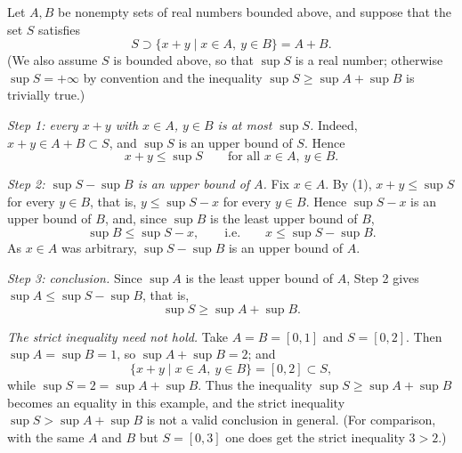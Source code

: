 \documentclass[11pt,a4paper]{article}
\newenvironment{solution}[1]{%
  \par\addvspace{1.7ex}%
  \noindent{\color{solutioncolor}\textbf{#1}}\hspace{0.55em}\ignorespaces}%
  {\par\addvspace{0.9ex}}
\begin{document}
\begin{solution}{Solution 2.4.7}\label{xs:2.4.7}
Let $A, B$ be nonempty sets of real numbers bounded above, and suppose that the set $S$ satisfies
\[
S \supset \{x + y \mid x \in A,\ y \in B\} = A + B .
\]
(We also assume $S$ is bounded above, so that $\sup S$ is a real number; otherwise $\sup S = +\infty$ by convention and the inequality $\sup S \ge \sup A + \sup B$ is trivially true.)

\emph{Step 1: every $x + y$ with $x \in A$, $y \in B$ is at most $\sup S$.} Indeed, $x + y \in A + B \subset S$, and $\sup S$ is an upper bound of $S$. Hence
\[
x + y \le \sup S \qquad \text{for all } x \in A,\ y \in B. \tag{1}
\]

\emph{Step 2: $\sup S - \sup B$ is an upper bound of $A$.} Fix $x \in A$. By (1), $x + y \le \sup S$ for every $y \in B$, that is, $y \le \sup S - x$ for every $y \in B$. Hence $\sup S - x$ is an upper bound of $B$, and, since $\sup B$ is the least upper bound of $B$,
\[
\sup B \le \sup S - x, \qquad \text{i.e.} \qquad x \le \sup S - \sup B .
\]
As $x \in A$ was arbitrary, $\sup S - \sup B$ is an upper bound of $A$.

\emph{Step 3: conclusion.} Since $\sup A$ is the least upper bound of $A$, Step 2 gives $\sup A \le \sup S - \sup B$, that is,
\[
\sup S \ge \sup A + \sup B .
\]

\emph{The strict inequality need not hold.} Take $A = B = [0,1]$ and $S = [0,2]$. Then $\sup A = \sup B = 1$, so $\sup A + \sup B = 2$; and
\[
\{x + y \mid x \in A,\ y \in B\} = [0,2] \subset S,
\]
while $\sup S = 2 = \sup A + \sup B$. Thus the inequality $\sup S \ge \sup A + \sup B$ becomes an equality in this example, and the strict inequality $\sup S > \sup A + \sup B$ is not a valid conclusion in general. (For comparison, with the same $A$ and $B$ but $S = [0,3]$ one does get the strict inequality $3 > 2$.)
\end{solution}
\end{document}
